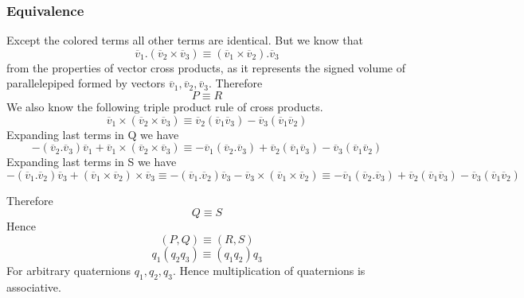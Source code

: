 \documentclass[12pt]{article}
\newcommand{\vv}[1]{\overline{v}_{#1}}
\begin{document}
\subsubsection*{Equivalence}
Except the colored terms all other terms are identical.
But we know that
\[
  \vv{1}.(\vv{2}\times\vv{3}) \equiv (\vv{1}\times\vv{2}).\vv{3}
\]
from the properties of vector cross products, as it represents the signed volume of parallelepiped formed by vectors $\vv{1}, \vv{2}, \vv{3}$.
Therefore
\[
P \equiv R
\]
We also know the following triple product rule of cross products.
\[
  \vv{1} \times (\vv{2}\times\vv{3})
  \equiv
  \vv{2} (\vv{1}\vv{3})
  - \vv{3} (\vv{1}\vv{2})
\]
Expanding last terms in Q we have
\[
  - (\vv{2}.\vv{3})\vv{1}
  + \vv{1} \times (\vv{2}\times\vv{3})
  \equiv
  - \vv{1} (\vv{2}.\vv{3})
  + \vv{2} (\vv{1}\vv{3})
  - \vv{3} (\vv{1}\vv{2})

\]
Expanding last terms in S we have
\[
  - (\vv{1}.\vv{2})\vv{3}
  + (\vv{1}\times\vv{2})\times\vv{3}
  \equiv
  - (\vv{1}.\vv{2})\vv{3}
  - \vv{3}\times(\vv{1}\times\vv{2})
  \equiv
  - \vv{1} (\vv{2}.\vv{3})
  + \vv{2} (\vv{1}\vv{3})
  - \vv{3} (\vv{1}\vv{2})
\]

Therefore
\[
Q \equiv S
\]
Hence
\[
  (P, Q) \equiv (R, S)
\]
\[
  q_1(q_2q_3) \equiv (q_1q_2)q_3
\]
For arbitrary quaternions $q_1, q_2, q_3$. Hence multiplication of quaternions is associative.
\end{document}
